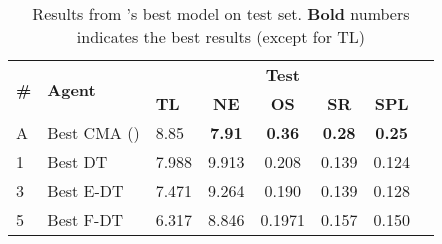 \begin{table*}

\caption{\label{table:all_test_final} Results from \citet{VLNCE}'s best model on test set. \textbf{Bold} numbers indicates the best results (except for TL)}
\renewcommand{\arraystretch}{1.2}
\centering
\small\addtolength{\tabcolsep}{-2.3pt}
\begin{tabular}{@{}lllccccc@{}}
\toprule
   \multirow{2}{*}{\textbf{\#}}
  & \multirow{2}{*}{\textbf{Agent}}
  & \multicolumn{5}{c}{\textbf{Test}} \\
  \cmidrule(l){3-7}
  & & \textbf{TL} & \textbf{NE} & \textbf{OS} & \textbf{SR} & \textbf{SPL} \\
\midrule
A & Best CMA (\citet{VLNCE})  & 8.85 & \textbf{7.91} & \textbf{0.36} & \textbf{0.28} & \textbf{0.25}  \\
\midrule
1 & Best DT  & 7.988 & 	9.913 & 0.208 & 0.139 & 0.124  \\
3 & Best E-DT  & 7.471 & 	9.264 & 0.190 & 0.139 & 0.128  \\
5 & Best F-DT  & 	6.317 & 		8.846 & 0.1971 & 0.157 & 0.150  \\

\bottomrule
\end{tabular}
\end{table*}
